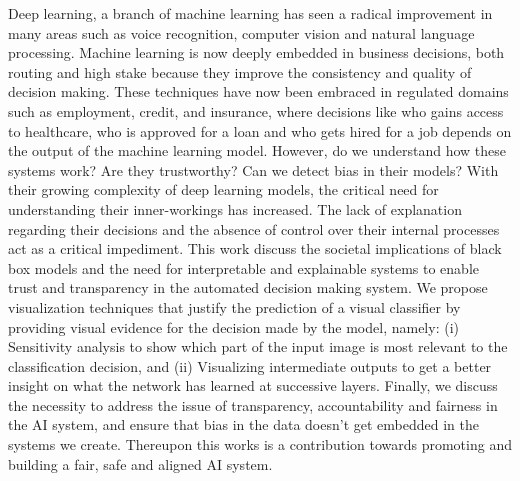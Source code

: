 %
%
%

\begin{publicabstract}

Deep learning, a branch of machine learning has seen a radical improvement in many areas such as voice recognition, computer vision and natural language processing. Machine learning is now deeply embedded in business decisions, both routing and high stake because they improve the consistency and quality of decision making. These techniques have now been embraced in regulated domains such as employment, credit, and insurance, where decisions like who gains access to healthcare, who is approved for a loan and who gets hired for a job depends on the output of the machine learning model. However, do we understand how these systems work? Are they trustworthy? Can we detect bias in their models? With their growing complexity of deep learning models,  the critical need for understanding their inner-workings has increased. The lack of explanation regarding their decisions and the absence of control over their internal processes act as a critical impediment. This work discuss the societal implications of black box models and the need for interpretable and explainable systems to enable trust and transparency in the automated decision making system. We propose visualization techniques that justify the prediction of a visual classifier by providing visual evidence for the decision made by the model, namely: (i) Sensitivity analysis to  show which part of the  input image  is  most  relevant  to  the  classification decision, and (ii) Visualizing intermediate outputs to get a better insight on what the network has learned at successive layers. Finally, we discuss the necessity to address the issue of transparency, accountability and fairness in the AI system, and ensure that bias in the data doesn't get embedded in the systems we create. Thereupon this works is a contribution towards promoting and building a fair, safe and aligned AI system.


\end{publicabstract}


